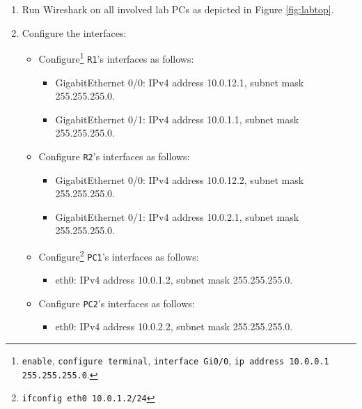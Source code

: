 \documentclass[pdftex,12pt,a4paper]{article}
\begin{document}
\begin{enumerate}
            \item Run Wireshark on all involved lab PCs as depicted in Figure
                \ref{fig:labtop}.
            \item Configure the interfaces:
                \begin{itemize}
                    \item Configure\footnote{\texttt{enable}, \texttt{configure
                        terminal}, \texttt{interface Gi0/0}, \texttt{ip address
                        10.0.0.1 255.255.255.0}.} \texttt{R1}'s interfaces as follows:
                        \begin{itemize}
                            \item GigabitEthernet 0/0: IPv4 address 10.0.12.1,
                                subnet mask 255.255.255.0.
                            \item GigabitEthernet 0/1: IPv4 address 10.0.1.1,
                                subnet mask 255.255.255.0.
                        \end{itemize}
                    \item Configure \texttt{R2}'s interfaces as follows:
                        \begin{itemize}
                            \item GigabitEthernet 0/0: IPv4 address 10.0.12.2,
                                subnet mask 255.255.255.0.
                            \item GigabitEthernet 0/1: IPv4 address 10.0.2.1,
                                subnet mask 255.255.255.0.
                        \end{itemize}
                    \item Configure\footnote{\texttt{ifconfig eth0 10.0.1.2/24}}
                        \texttt{\texttt{PC1}}'s interfaces as follows:
                        \begin{itemize}
                            \item eth0: IPv4 address 10.0.1.2,
                                subnet mask 255.255.255.0.
                        \end{itemize}
                    \item Configure \texttt{\texttt{PC2}}'s interfaces as follows:
                        \begin{itemize}
                            \item eth0: IPv4 address 10.0.2.2,
                                subnet mask 255.255.255.0.
                        \end{itemize}
                \end{itemize}
                

\end{enumerate}
\end{document}
